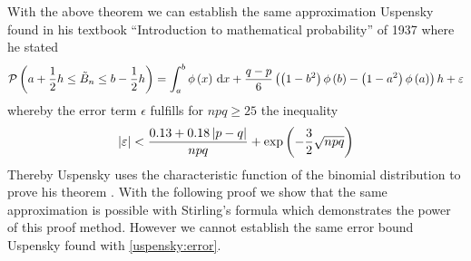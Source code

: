 
\begin{remark}
  With the above theorem we can establish the same approximation Uspensky found in his textbook ``Introduction to mathematical probability'' of 1937 where he stated \cite[p. 129]{uspensky}
  \begin{align}
    \mathcal P\left({a+\frac 12h \le \tilde B_{n} \le b-\frac 12h}\right) = \int_a^b \phi\left( {x} \right) \,\mathrm d{x} + \frac{q-p}6 \left( {\left( {1-b^2} \right)\phi\left( {b} \right) - \left( {1-a^2} \right)\phi\left( {a} \right)} \right) h + \varepsilon
  \end{align}
  whereby the error term $\epsilon$ fulfills for $npq \ge 25$ the inequality
  \begin{align} \label{uspensky:error}
    \left|{\varepsilon}\right| < \frac{0.13+0.18\left|{p-q}\right|}{npq} + \exp\left( {-\frac 32 \sqrt{npq}} \right)
  \end{align}
  Thereby Uspensky uses the characteristic function of the binomial distribution to prove his theorem \cite[pp. 119-129]{uspensky}. With the following proof we show that the same approximation is possible with Stirling's formula which demonstrates the power of this proof method. However we cannot establish the same error bound Uspensky found with \eqref{uspensky:error}.
\end{remark}

